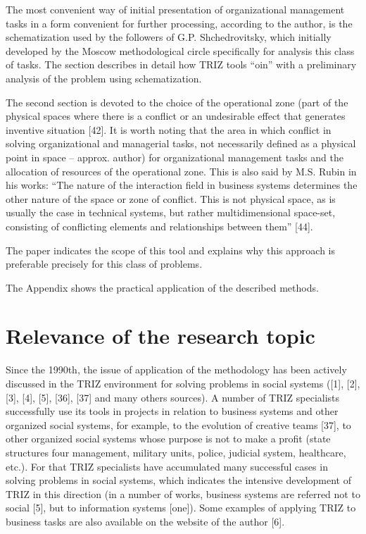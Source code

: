 \documentclass[11pt,a4paper]{book}
\begin{document}
The most convenient way of initial presentation of organizational management
tasks in a form convenient for further processing, according to the author, is
the schematization used by the followers of G.P. Shchedrovitsky, which
initially developed by the Moscow methodological circle specifically for
analysis this class of tasks. The section describes in detail how TRIZ tools
“oin” with a preliminary analysis of the problem using schematization.

The second section is devoted to the choice of the operational zone (part of
the physical spaces where there is a conflict or an undesirable effect that
generates inventive situation [42]. It is worth noting that the area in which
conflict in solving organizational and managerial tasks, not necessarily
defined as a physical point in space -- approx. author) for organizational
management tasks and the allocation of resources of the operational zone. This
is also said by M.S. Rubin in his works: “The nature of the interaction field
in business systems determines the other nature of the space or zone of
conflict. This is not physical space, as is usually the case in technical
systems, but rather multidimensional space-set, consisting of conflicting
elements and relationships between them” [44].

The paper indicates the scope of this tool and explains why this approach is
preferable precisely for this class of problems.

The Appendix shows the practical application of the described methods.

\section{Relevance of the research topic}

Since the 1990th, the issue of application of the methodology has been
actively discussed in the TRIZ environment for solving problems in social
systems ([1], [2], [3], [4], [5], [36], [37] and many others sources). A
number of TRIZ specialists successfully use its tools in projects in relation
to business systems and other organized social systems, for example, to the
evolution of creative teams [37], to other organized social systems whose
purpose is not to make a profit (state structures four management, military
units, police, judicial system, healthcare, etc.). For that TRIZ specialists
have accumulated many successful cases in solving problems in social systems,
which indicates the intensive development of TRIZ in this direction (in a
number of works, business systems are referred not to social [5], but to
information systems [one]). Some examples of applying TRIZ to business tasks
are also available on the website of the author [6].
\end{document}
